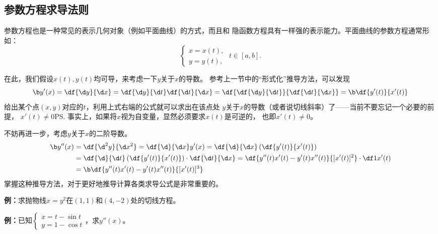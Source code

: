 \subsection{参数方程求导法则}

参数方程也是一种常见的表示几何对象（例如平面曲线）的方式，而且和
隐函数方程具有一样强的表示能力。平面曲线的参数方程通常形如：
$$
	\left\{\begin{array}{l}
		x=x(t),\\
		y=y(t),
	\end{array}\right.\;t\in [a,b].
$$

在此，我们假设$x(t),y(t)$均可导，来考虑一下$y$关于$x$的导数。
参考上一节中的“形式化”推导方法，可以发现
$${\b y'(x)}=\df{\d y}{\d x}=\df{\d y}{\d t}\df{\d t}{\d x}
=\df{\df{\d y}{\d t}}{\df{\d t}{\d x}}={\b \df{y'(t)}{x'(t)}}$$
给出某个点$(x,y)$对应的$t$，利用上式右端的公式就可以求出在该点处
$y$关于$x$的导数（或者说切线斜率）了——当前不要忘记一个必要的前提，
$x'(t)\ne 0$\ps{事实上，如果将$x$视为自变量，显然必须要求$x(t)$是可逆的，
也即$x'(t)\ne 0$}。

不妨再进一步，考虑$y$关于$x$的二阶导数。
\begin{align*}
	{\b y''(x)}&=\df{\d^2y}{\d x^2}=\df{\d}{\d x}y'(x)
	=\df{\d}{\d x}\left(\df{y'(t)}{x'(t)}\right)\\
	&=\df{\d}{\d t}\left(\df{y'(t)}{x'(t)}\right)\cdot\df{\d t}{\d x}
	=\df{y''(t)x'(t)-y'(t)x''(t)}{[x'(t)]^2}\cdot\df1{x'(t)}\\
	&={\b \df{y''(t)x'(t)-y'(t)x''(t)}{[x'(t)]^3}}
\end{align*}
掌握这种推导方法，对于更好地推导计算各类求导公式是非常重要的。

{\bf 例：}求抛物线$x=y^2$在$(1,1)$和$(4,-2)$处的切线方程。

{\bf 例：}已知$\left\{\begin{array}{l}x=t-\sin t\\
y=1-\cos t\end{array}\right.$，求$y''(x)$。
\begin{center}
\end{center}

